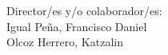 {\raggedleft
Director/es y/o colaborador/es:\\
   \vspace{ 1cm}
Igual Peña, Francisco Daniel\\
Olcoz Herrero, Katzalin\\
}



